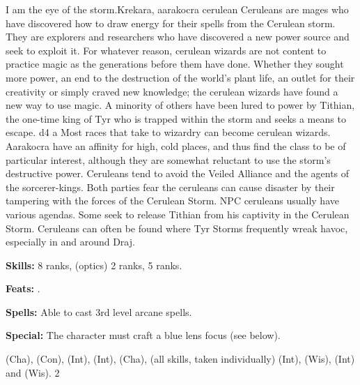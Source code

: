{I am the eye of the storm.}{Krekara, aarakocra cerulean}
{Ceruleans are mages who have discovered how to draw energy for their spells from the Cerulean storm. They are explorers and researchers who have discovered a new power source and seek to exploit it. For whatever reason, cerulean wizards are not content to practice magic as the generations before them have done. Whether they sought more power, an end to the destruction of the world’s plant life, an outlet for their creativity or simply craved new knowledge; the cerulean wizards have found a new way to use magic. A minority of others have been lured to power by Tithian, the one-time king of Tyr who is trapped within the storm and seeks a means to escape.}
{d4}
{a}
{Most races that take to wizardry can become cerulean wizards. Aarakocra have an affinity for high, cold places, and thus find the class to be of particular interest, although they are somewhat reluctant to use the storm’s destructive power. Ceruleans tend to avoid the Veiled Alliance and the agents of the sorcerer-kings. Both parties fear the ceruleans can cause disaster by their tampering with the forces of the Cerulean Storm. NPC ceruleans usually have various agendas. Some seek to release Tithian from his captivity in the Cerulean Storm. Ceruleans can often be found where Tyr Storms frequently wreak havoc, especially in and around Draj.}
{
\textbf{Skills:}  8 ranks,  (optics) 2 ranks,  5 ranks.

\textbf{Feats:} .

\textbf{Spells:} Able to cast 3rd level arcane spells.

\textbf{Special:} The character must craft a blue lens focus (see below).
}
{ (Cha),  (Con),  (Int),  (Int),  (Cha),  (all skills, taken individually) (Int),  (Wis),  (Int) and  (Wis).}
{2}
